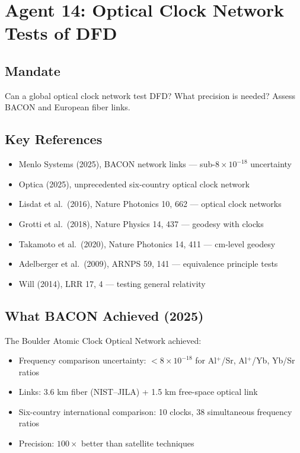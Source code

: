\documentclass[11pt,a4paper]{article}
\begin{document}
\section{Agent 14: Optical Clock Network Tests of DFD}
\label{sec:agent14}

\subsection{Mandate}

Can a global optical clock network test DFD? What precision is needed? Assess BACON and European fiber links.

\subsection{Key References}

\begin{itemize}
\item Menlo Systems (2025), BACON network links --- sub-$8\times10^{-18}$ uncertainty
\item Optica (2025), unprecedented six-country optical clock network
\item Lisdat et al.\ (2016), Nature Photonics 10, 662 --- optical clock networks
\item Grotti et al.\ (2018), Nature Physics 14, 437 --- geodesy with clocks
\item Takamoto et al.\ (2020), Nature Photonics 14, 411 --- cm-level geodesy
\item Adelberger et al.\ (2009), ARNPS 59, 141 --- equivalence principle tests
\item Will (2014), LRR 17, 4 --- testing general relativity
\end{itemize}

\subsection{What BACON Achieved (2025)}

The Boulder Atomic Clock Optical Network achieved:
\begin{itemize}
\item Frequency comparison uncertainty: $< 8\times10^{-18}$ for Al$^+$/Sr, Al$^+$/Yb, Yb/Sr ratios
\item Links: 3.6 km fiber (NIST--JILA) + 1.5 km free-space optical link
\item Six-country international comparison: 10 clocks, 38 simultaneous frequency ratios
\item Precision: $100\times$ better than satellite techniques
\end{itemize}
\end{document}
